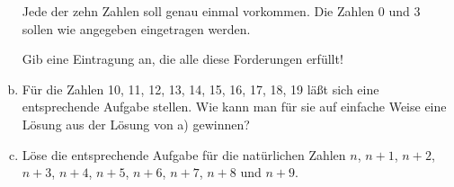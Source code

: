 \begin{exercise}
\begin{enumerate}[a)]
\begin{minipage}[t]{0.74\linewidth}
              Jede der zehn Zahlen soll genau einmal vorkommen. Die Zahlen 0 und 3
              sollen wie angegeben eingetragen werden.\medskip\par
              Gib eine Eintragung an, die alle diese Forderungen erfüllt!
            \end{minipage}
      \item Für die Zahlen 10, 11, 12, 13, 14, 15, 16, 17, 18, 19 läßt sich
            eine entsprechende Aufgabe stellen. Wie kann man für sie auf einfache
            Weise eine Lösung aus der Lösung von a) gewinnen?
      \item Löse die entsprechende Aufgabe für die natürlichen Zahlen
            $n$, $n+1$, $n+2$, $n+3$, $n+4$, $n+5$, $n+6$, $n+7$, $n+8$ und $n+9$.
    \end{enumerate}
  \fi
\end{exercise}

